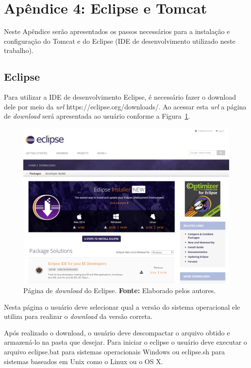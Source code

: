 \chapter*{Apêndice 4: Eclipse e Tomcat}
\label{apendice:eclipse_tomcat}

Neste Apêndice serão apresentados os passos necessários para a instalação e configuração do Tomcat e do Eclipse (IDE de desenvolvimento utilizado neste trabalho).

\section*{Eclipse}

Para utilizar a IDE de desenvolvimento Eclipse, é necessário fazer o download dele por meio da \textit{url} https://eclipse.org/downloads/. Ao acessar esta \textit{url} a página de \textit{download} será apresentada ao usuário conforme a Figura~\ref{fig:ap2:pagina_download_eclipse}.

\captionsetup[figure]{list=no}
\begin{figure}[h!]
	\centerline{\includegraphics[scale=0.4]{./imagens/apendices/pagina-download-eclipse.png}}
	\caption[Página de \textit{download} do Eclipse.]
	{Página de \textit{download} do Eclipse. \textbf{Fonte:} Elaborado pelos autores.}
	\label{fig:ap2:pagina_download_eclipse}
\end{figure}

Nesta página o usuário deve selecionar qual a versão do sistema operacional ele utiliza para realizar o \textit{download} da versão correta.

Após realizado o download, o usuário deve descompactar o arquivo obtido e armazená-lo na pasta que desejar. Para iniciar o eclipse o usuário deve executar o arquivo eclipse.bat para sistemas operacionais Windows ou eclipse.sh para sistemas baseados em Unix como o Linux ou o OS X.

